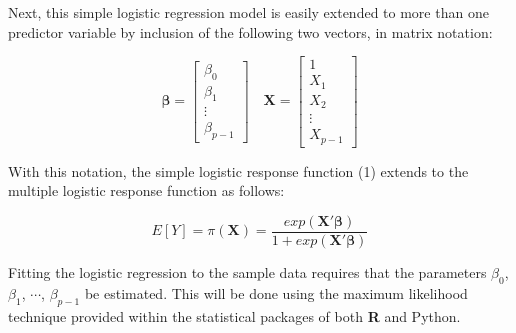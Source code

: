 Next, this simple logistic regression model is easily extended to more than one predictor variable by inclusion of the following two vectors, in matrix notation:

\[
	\boldsymbol{\beta} = 
	\begin{bmatrix}
		\beta_0 \\ \beta_1 \\ \vdots \\ \beta_{p-1}
	\end{bmatrix} \quad
	\textbf{X} = 
	\begin{bmatrix}
		1 \\ X_1 \\ X_2 \\ \vdots \\ X_{p-1}
	\end{bmatrix} 
\]


With this notation, the simple logistic response function (1) extends to the multiple logistic response function as follows:

\begin{equation}
	E[Y] = \pi(\textbf{X}) = \frac{exp(\textbf{X}'\boldsymbol{\beta})}{1+exp(\textbf{X}'\boldsymbol{\beta})}
\end{equation}

Fitting the logistic regression to the sample data requires that the parameters \(\beta_0\), \(\beta_1\), \(\cdots\), \(\beta_{p-1}\) be estimated. This will be done using the maximum likelihood technique provided within the statistical packages of both \textbf{R} and Python.


